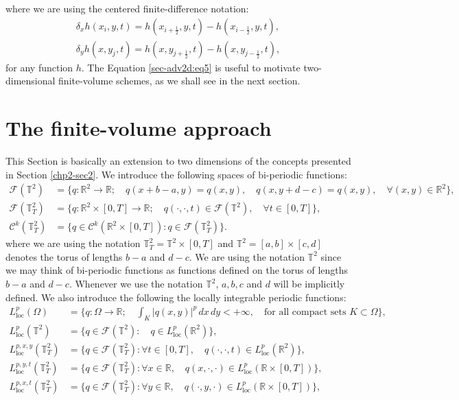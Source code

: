 where we are using the centered finite-difference notation:
\begin{align}
	\label{sec-adv2d:eq6}
	\delta_x {h}(x_i,y, t) = 
	{h}(x_{i+\frac{1}{2}}, y, t) - 
	{h}(x_{i-\frac{1}{2}}, y, t), \\
	\delta_y {h}(x, y_j,t) = 
    {h}(x, y_{j+\frac{1}{2}},t) - 
    {h}(x, y_{j-\frac{1}{2}},t),
\end{align}
for any function ${h}$. The Equation \eqref{sec-adv2d:eq5} is useful to
motivate two-dimensional finite-volume schemes, as we shall see in the next section.

\section{The finite-volume approach}
\label{sec:fv-2d}
This Section is basically an extension to two dimensions of the concepts presented in Section \ref{chp2-sec2}.
We introduce the following spaces of bi-periodic functions:
\begin{align*}
	\mathcal{F}(\mathbb{T}^2) &= \{q:\mathbb{R}^2 \to \mathbb{R};
	\quad q(x+b-a,y) = q(x,y), \quad q(x,y+d-c) = q(x,y),\quad \forall (x,y) \in \mathbb{R}^2\},\\
	\mathcal{F}(\mathbb{T}^2_{T}) &= \{q:\mathbb{R}^2\times[0,T]\to \mathbb{R};\quad q(\cdot,\cdot,t) \in \mathcal{F}(\mathbb{T}^2), \quad \forall t \in [0,T]\},\\
	\mathcal{C}^k(\mathbb{T}^2_{T}) &= \{q\in \mathcal{C}^k(\mathbb{R}^2\times[0,T]): q \in \mathcal{F}(\mathbb{T}^2_{T})\}.
\end{align*}
where we are using the notation $\mathbb{T}^2_{T} = \mathbb{T}^2\times[0,T]$ and $\mathbb{T}^2 = [a,b] \times [c,d]$ denotes the torus of lengths $b-a$ and $d-c$.
We are using the notation $\mathbb{T}^2$ since we may think of bi-periodic functions as functions defined on the torus of lengths $b-a$ and $d-c$.
Whenever we use the notation $\mathbb{T}^2$, $a, b, c$ and $d$ will be implicitly defined.
We also introduce the following the locally integrable periodic functions:
\begin{align*}
	L^p_{\text{loc}}(\Omega) &= \{q:\Omega\to \mathbb{R};\quad \int_{K} |q(x,y)|^p\,dx\,dy  < +\infty, \quad \text{for all compact sets } K \subset \Omega\},\\
	{L}^{p}_{\text{loc}}(\mathbb{T}^2) &= \{q\in \mathcal{F}(\mathbb{T}^2): \quad  q \in L^p_{\text{loc}}(\mathbb{R}^2)\},\\
	{L}^{p,x,y}_{\text{loc}}(\mathbb{T}^2_{T}) &= \{q\in \mathcal{F}(\mathbb{T}^2_{T}): \forall t \in [0,T], \quad q(\cdot,\cdot,t) \in L^p_{\text{loc}}(\mathbb{R}^2)\},\\
	{L}^{p,y,t}_{\text{loc}}(\mathbb{T}^2_{T}) &= \{q\in \mathcal{F}(\mathbb{T}^2_{T}): \forall x \in \mathbb{R},\quad q(x,\cdot,\cdot) \in L^p_{\text{loc}}(\mathbb{R}\times [0,T])\},\\
	{L}^{p,x,t}_{\text{loc}}(\mathbb{T}^2_{T}) &= \{q\in \mathcal{F}(\mathbb{T}^2_{T}): \forall y \in \mathbb{R},\quad q(\cdot,y,\cdot) \in L^p_{\text{loc}}(\mathbb{R}\times [0,T])\},\\
\end{align*}

